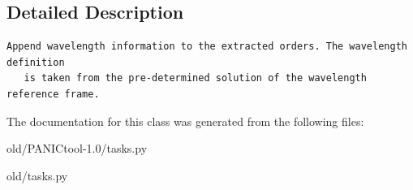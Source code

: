 \subsection{Detailed Description}


\footnotesize\begin{verbatim}Append wavelength information to the extracted orders. The wavelength definition
   is taken from the pre-determined solution of the wavelength reference frame.
\end{verbatim}
\normalsize
 



The documentation for this class was generated from the following files:\begin{CompactItemize}
\item 
old/PANICtool-1.0/tasks.py\item 
old/tasks.py\end{CompactItemize}

